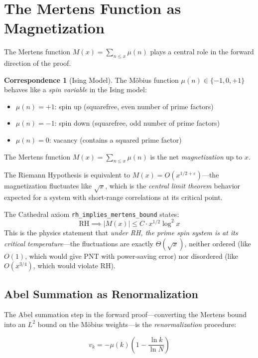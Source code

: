 \documentclass[11pt,a4paper]{article}
\theoremstyle{definition}
\newtheorem{correspondence}[definition]{Correspondence}
\newcommand{\RH}{\mathrm{RH}}
\newcommand{\lean}[1]{\texttt{#1}}
\begin{document}
\section{The Mertens Function as Magnetization}
\label{sec:mertens}

The Mertens function $M(x) = \sum_{n \leq x} \mu(n)$ plays a central
role in the forward direction of the proof.

\begin{correspondence}[Ising Model]
The M\"obius function $\mu(n) \in \{-1, 0, +1\}$ behaves like a
\emph{spin variable} in the Ising model:
\begin{itemize}
  \item $\mu(n) = +1$: spin up (squarefree, even number of prime factors)
  \item $\mu(n) = -1$: spin down (squarefree, odd number of prime factors)
  \item $\mu(n) = 0$: vacancy (contains a squared prime factor)
\end{itemize}
The Mertens function $M(x) = \sum_{n \leq x} \mu(n)$ is the net
\emph{magnetization} up to $x$.

The Riemann Hypothesis is equivalent to $M(x) = O(x^{1/2+\varepsilon})$---the
magnetization fluctuates like $\sqrt{x}$, which is the \emph{central limit
theorem} behavior expected for a system with short-range correlations at
its critical point.
\end{correspondence}

The Cathedral axiom \lean{rh\_implies\_mertens\_bound} states:
\[
  \RH \implies |M(x)| \leq C \cdot x^{1/2} \log^2 x
\]
This is the physics statement that \emph{under RH, the prime spin system
is at its critical temperature}---the fluctuations are exactly
$\Theta(\sqrt{x})$, neither ordered (like $O(1)$, which would give PNT
with power-saving error) nor disordered (like $O(x^{3/4})$, which would
violate RH).

\subsection{Abel Summation as Renormalization}

The Abel summation step in the forward proof---converting the Mertens
bound into an $L^2$ bound on the M\"obius weights---is the
\emph{renormalization} procedure:

\[
  v_k = -\mu(k)\left(1 - \frac{\ln k}{\ln N}\right)
\]
\end{document}
